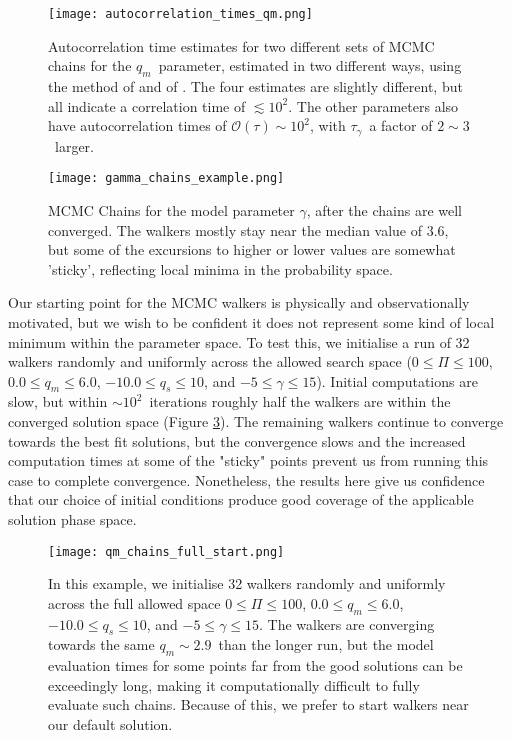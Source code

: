 \documentclass[printer]{aa}
\begin{document}
\begin{figure}
  \texttt{[image: autocorrelation\_times\_qm.png]}
  \caption{Autocorrelation time estimates for two different sets of MCMC chains for the $q_m$~parameter, estimated in two different ways, using the method of \citet{2010GW} and of \citet{2013PASP..125..306F}.  The four estimates are slightly different, but all indicate a correlation time of $\lesssim 10^2$.  The other parameters also have autocorrelation times of $\mathcal{O}\left(\tau\right) \sim 10^2$, with $\tau_\gamma$~a factor of $2\sim3$~larger.}
  \label{fig:qm_chains}
\end{figure}

\begin{figure}
  \texttt{[image: gamma\_chains\_example.png]}
  \caption{MCMC Chains for the model parameter $\gamma$, after the chains are well converged.  The walkers mostly stay near the median value of $3.6$, but some of the excursions to higher or lower values are somewhat 'sticky', reflecting local minima in the probability space.}
  \label{fig:gamma_chains}
\end{figure}

Our starting point for the MCMC walkers is physically and observationally motivated, but we wish to be confident it does not represent some kind of local minimum within the parameter space.  To test this, we initialise a run of 32 walkers randomly and uniformly across the allowed search space ($0 \leq \Pi \leq 100$, $0.0 \leq q_m \leq 6.0$, $-10.0 \leq q_s \leq 10$, and $-5 \leq \gamma \leq 15$).  Initial computations are slow, but within $\sim 10^2$~iterations roughly half the walkers are within the converged solution space (Figure \ref{fig:qm_chains_full}).  The remaining walkers continue to converge towards the best fit solutions, but the convergence slows and the increased computation times at some of the "sticky" points prevent us from running this case to complete convergence.  Nonetheless, the results here give us confidence that our choice of initial conditions produce good coverage of the applicable solution phase space.

\begin{figure}
    \centering
    \texttt{[image: qm\_chains\_full\_start.png]}
    \caption{In this example, we initialise 32 walkers randomly and uniformly across the full allowed space $0 \leq \Pi \leq 100$, $0.0 \leq q_m \leq 6.0$, $-10.0 \leq q_s \leq 10$, and $-5 \leq \gamma \leq 15$.  The walkers are converging towards the same $q_m \sim 2.9$~than the longer run, but the model evaluation times for some points far from the good solutions can be exceedingly long, making it computationally difficult to fully evaluate such chains.  Because of this, we prefer to start walkers near our default solution.}
    \label{fig:qm_chains_full}
\end{figure}
\end{document}
